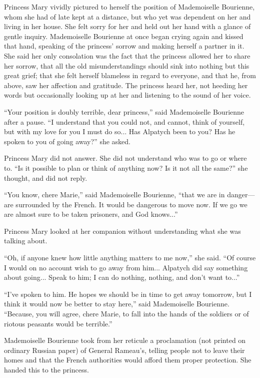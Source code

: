 Princess Mary vividly pictured to herself the position of
Mademoiselle Bourienne, whom she had of late kept at a distance,
but who yet was dependent on her and living in her house. She
felt sorry for her and held out her hand with a glance of gentle
inquiry. Mademoiselle Bourienne at once began crying again and
kissed that hand, speaking of the princess' sorrow and making
herself a partner in it. She said her only consolation was the
fact that the princess allowed her to share her sorrow, that all
the old misunderstandings should sink into nothing but this great
grief; that she felt herself blameless in regard to everyone, and
that he, from above, saw her affection and gratitude. The
princess heard her, not heeding her words but occasionally
looking up at her and listening to the sound of her voice.

``Your position is doubly terrible, dear princess,'' said
Mademoiselle Bourienne after a pause. ``I understand that you
could not, and cannot, think of yourself, but with my love for
you I must do so... Has Alpatych been to you? Has he spoken to
you of going away?'' she asked.

Princess Mary did not answer. She did not understand who was to
go or where to. ``Is it possible to plan or think of anything
now? Is it not all the same?'' she thought, and did not reply.

``You know, chere Marie,'' said Mademoiselle Bourienne, ``that we
are in danger---are surrounded by the French. It would be
dangerous to move now.  If we go we are almost sure to be taken
prisoners, and God knows...''

Princess Mary looked at her companion without understanding what
she was talking about.

``Oh, if anyone knew how little anything matters to me now,'' she
said.  ``Of course I would on no account wish to go away from
him... Alpatych did say something about going... Speak to him; I
can do nothing, nothing, and don't want to...''

``I've spoken to him. He hopes we should be in time to get away
tomorrow, but I think it would now be better to stay here,'' said
Mademoiselle Bourienne. ``Because, you will agree, chere Marie,
to fall into the hands of the soldiers or of riotous peasants
would be terrible.''

Mademoiselle Bourienne took from her reticule a proclamation (not
printed on ordinary Russian paper) of General Rameau's, telling
people not to leave their homes and that the French authorities
would afford them proper protection. She handed this to the
princess.

